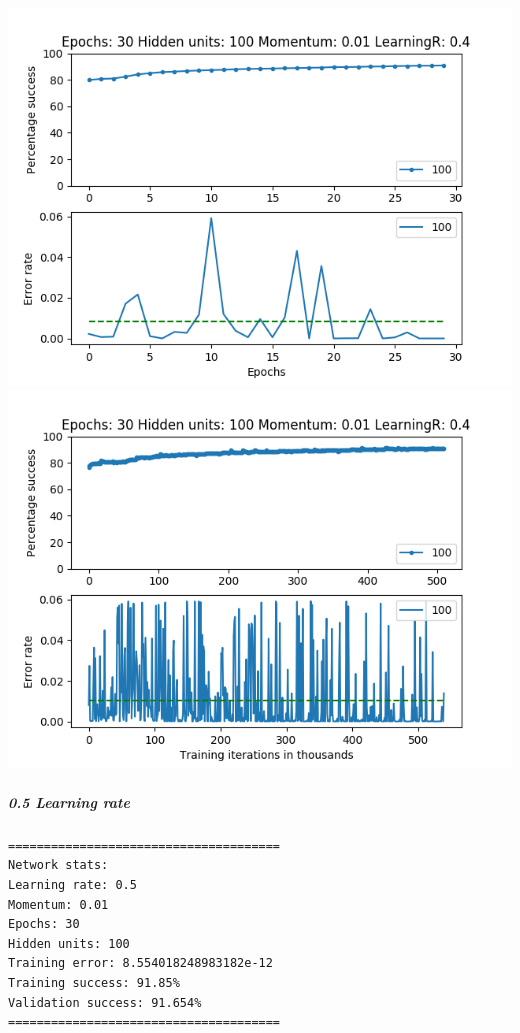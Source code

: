 \documentclass[11pt]{article}
\makeatletter
\def\maxwidth{\ifdim\Gin@nat@width>\linewidth\linewidth
    \else\Gin@nat@width\fi}
\let\Oldincludegraphics\includegraphics
\renewcommand{\includegraphics}[1]{\Oldincludegraphics[width=.8\maxwidth]{#1}}
\makeatother
\begin{document}
\includegraphics{Experiment2/E2_NN_Epoch_Momentum_0.01_30Epochs_100_LR_0.4_Hiddenunits.png}
\includegraphics{Experiment2/E2_NN_Training_Momentum_0.01_30Epochs_100_LR_0.4_Hiddenunits.png}

\hypertarget{learning-rate-5}{%
\subparagraph{0.5 Learning rate}\label{learning-rate-5}}

\begin{verbatim}
======================================
Network stats: 
Learning rate: 0.5
Momentum: 0.01
Epochs: 30
Hidden units: 100
Training error: 8.554018248983182e-12
Training success: 91.85%
Validation success: 91.654%
======================================
\end{verbatim}
\end{document}
